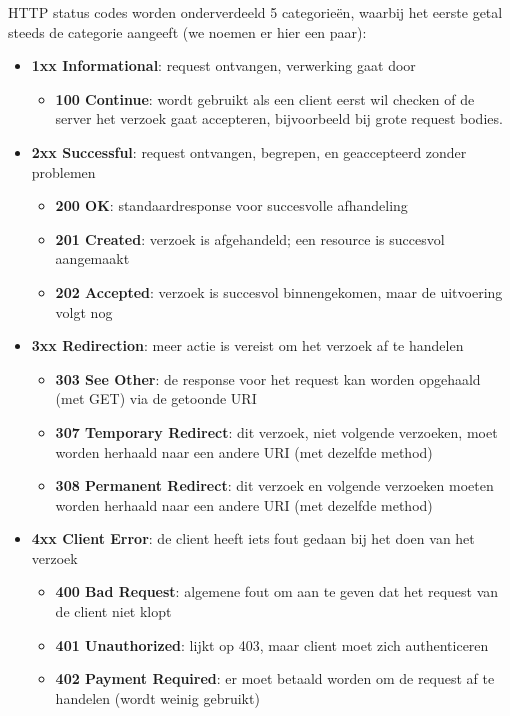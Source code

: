 HTTP status codes worden onderverdeeld 5 categorieën, waarbij 
het eerste getal steeds de categorie aangeeft (we noemen er hier een paar):
\begin{itemize}
    \item \textbf{1xx Informational}: request ontvangen, verwerking gaat door
        \begin{itemize}
            \item \textbf{100 Continue}: wordt gebruikt als een client eerst wil checken of de server het verzoek 
            gaat accepteren, bijvoorbeeld bij grote request bodies.
        \end{itemize}
    \item \textbf{2xx Successful}: request ontvangen, begrepen, en geaccepteerd zonder problemen
        \begin{itemize}
            \item \textbf{200 OK}: standaardresponse voor succesvolle afhandeling
            \item \textbf{201 Created}: verzoek is afgehandeld; een resource is succesvol aangemaakt
            \item \textbf{202 Accepted}: verzoek is succesvol binnengekomen, maar de uitvoering volgt nog
        \end{itemize}
    \item \textbf{3xx Redirection}: meer actie is vereist om het verzoek af te handelen
    \begin{itemize}
        \item \textbf{303 See Other}: de response voor het request kan worden opgehaald (met GET) via de getoonde URI
        \item \textbf{307 Temporary Redirect}: dit verzoek, niet volgende verzoeken, moet worden herhaald naar een andere URI (met dezelfde method)
        \item \textbf{308 Permanent Redirect}: dit verzoek en volgende verzoeken moeten worden herhaald naar een andere URI (met dezelfde method)
    \end{itemize}
    \item \textbf{4xx Client Error}: de client heeft iets fout gedaan bij het doen van het verzoek
    \begin{itemize}
        \item \textbf{400 Bad Request}: algemene fout om aan te geven dat het request van de client niet klopt
        \item \textbf{401 Unauthorized}: lijkt op 403, maar client moet zich authenticeren
        \item \textbf{402 Payment Required}: er moet betaald worden om de request af te handelen (wordt weinig gebruikt)

\end{itemize}
\end{itemize}
